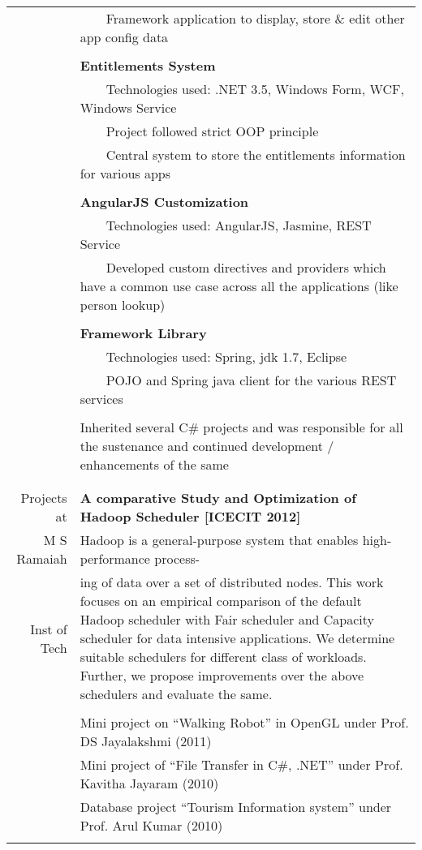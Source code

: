 \documentclass[a4paper,10pt]{article} %
\newcommand{\tabitem}{~~\llap{\textbullet}~~}
\begin{document}
\begin{tabular}{rp{13cm}}
& \tabitem Framework application to display, store \& edit other app config data \\
&\\
& \textbf{Entitlements System}\\
& \tabitem Technologies used: .NET 3.5, Windows Form, WCF, Windows Service\\
& \tabitem Project followed strict OOP principle\\
& \tabitem Central system to store the entitlements information for various apps\\
&\\
& \textbf{AngularJS Customization} \\
& \tabitem Technologies used: AngularJS, Jasmine, REST Service\\
& \tabitem Developed custom directives and providers which have a common use case across all the applications (like person lookup) \\ 
&\\
& \textbf{Framework Library} \\
& \tabitem Technologies used: Spring, jdk 1.7, Eclipse\\
& \tabitem POJO and Spring java client for the various REST services \\ 
&\\
& Inherited several C\# projects and was responsible for all the sustenance and continued development / enhancements of the same\\
&\\
&\\
Projects at & \textbf{A comparative Study and Optimization of Hadoop Scheduler [ICECIT 2012]}\\ 
M S Ramaiah & \setlength{\leftskip}{0.4cm} Hadoop is a general-purpose system that enables high-performance process-\\
Inst of Tech & \setlength{\leftskip}{0.4cm}
ing  of data over a set of distributed nodes. This work focuses on an empirical comparison of the default Hadoop scheduler with Fair scheduler and Capacity scheduler for data intensive applications. We determine suitable schedulers for different class of workloads. Further, we propose improvements over the above schedulers and evaluate  the same.\\ 
& \\
& Mini project on “Walking Robot” in OpenGL under Prof. DS Jayalakshmi (2011)\\ 
& Mini project of “File Transfer in C\#, .NET” under Prof. Kavitha Jayaram (2010)\\
& Database project “Tourism Information system” under Prof. Arul Kumar (2010)\\
& \\
\end{tabular}
\\
\end{document}
